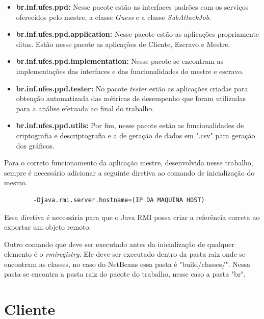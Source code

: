 \documentclass[
	12pt,				%
    oneside,			%
	a4paper,			%
	english,			%
	brazil,				%
	]{abntex2}
\begin{document}
\begin{itemize}

	\item \textbf{br.inf.ufes.ppd:} Nesse pacote estão as interfaces padrões com os serviços oferecidos pelo mestre,
	a classe \textit{Guess} e a classe \textit{SubAttackJob}.
	
	\item \textbf{br.inf.ufes.ppd.application:} Nesse pacote estão as aplicações propriamente ditas. Estão nesse pacote as
	aplicações de Cliente, Escravo e Mestre.

	\item \textbf{br.inf.ufes.ppd.implementation:} Nesse pacote se encontram as implementações das interfaces e das 
	funcionalidades do mestre e escravo. 
	
	\item \textbf{br.inf.ufes.ppd.tester:} No pacote \textit{tester} estão as aplicações criadas para obtenção automatizada
	das 	métricas de desempenho que foram utilizadas para a análise efetuada ao final do trabalho.
	
	\item \textbf{br.inf.ufes.ppd.utils:} Por fim, nesse pacote estão as funcionalidades de criptografia e descriptografia e 
	a de geração de dados em ".csv" para geração dos gráficos.
		

\end{itemize}

Para o correto funcionamento da aplicação mestre, desenvolvida nesse trabalho, sempre é necessário adicionar a seguinte diretiva ao comando de inicialização do mesmo.

\begin{center}
	\begin{lstlisting}
		-Djava.rmi.server.hostname=(IP DA MAQUINA HOST)
	\end{lstlisting}
\end{center}

Essa diretiva é necessária para que o Java RMI possa criar a referência correta ao exportar um objeto remoto. 

Outro comando que deve ser executado antes da inicialização de qualquer elemento é o \textit{rmiregistry}. Ele deve ser
executado dentro da pasta raiz onde se encontram as classes, no caso do NetBeans essa pasta é "build/classes/".
Nessa pasta se encontra a pasta raiz do pacote do trabalho, nesse caso a pasta "br".

\section{Cliente}
\end{document}
